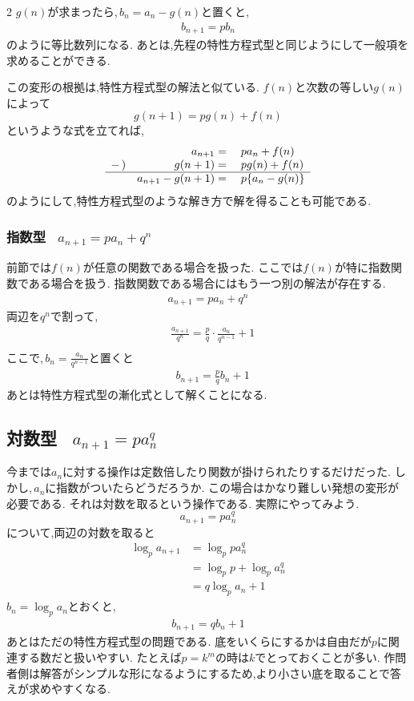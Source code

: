 \documentclass[dvipdfmx,a4paper,11pt,fleqn,openany]{jsbook}
\begin{document}
\begin{multicols*}{2}
      $g(n)$が求まったら,\,$b_n=a_n-g(n)$と置くと,
      \begin{align*}
        b_{n+1}=pb_n
      \end{align*}
      のように等比数列になる.
      あとは,先程の特性方程式型と同じようにして一般項を求めることができる.

      この変形の根拠は,特性方程式型の解法と似ている.
      $f(n)$と次数の等しい$g(n)$によって
      \[
        g(n+1)=pg(n)+f(n)
      \]
      というような式を立てれば,
      \[
        \begin{array}{rrl}
          & a_{n+1}={} & pa_n+f(n)\\
          -\,) & g(n+1)={} & pg(n)+f(n)\\ \hline
          & a_{n+1}-g(n+1)={} & p\{a_n-g(n)\}
        \end{array}
      \]
      のようにして,特性方程式型のような解き方で解を得ることも可能である.
    \subsubsection{指数型  \, $\displaystyle a_{n+1}=pa_n+q^n$}
      前節では$f(n)$が任意の関数である場合を扱った.
      ここでは$f(n)$が特に指数関数である場合を扱う.
      指数関数である場合にはもう一つ別の解法が存在する.
      \begin{align*}
        a_{n+1}=pa_n+q^n
      \end{align*}
      両辺を$q^n$で割って,
      \begin{align*}      
        &\frac{a_{n+1}}{q^n}=\frac{p}{q}\cdot\frac{a_n}{q^{n-1}}+1\\
      \end{align*}
      ここで,\,$b_n=\frac{a_n}{q^{n-1}}$と置くと
      \begin{align*}
        &b_{n+1}=\frac{p}{q}b_n+1
      \end{align*}
      あとは特性方程式型の漸化式として解くことになる.
  \subsection{対数型 \, $a_{n+1}=pa_n^q$}
    今までは$a_n$に対する操作は定数倍したり関数が掛けられたりするだけだった.
    しかし,\,$a_n$に指数がついたらどうだろうか.
    この場合はかなり難しい発想の変形が必要である.
    それは対数を取るという操作である.
    実際にやってみよう.
    \[
      a_{n+1}=pa_n^q
    \]
    について,両辺の対数を取ると
    \begin{align*}
      \log_p{a_{n+1}}&=\log_p{pa_n^q}\\
      &=\log_p{p}+\log_p{a_n^q}\\
      &=q\log_p{a_n}+1
    \end{align*}
    $b_n=\log_p{a_n}$とおくと,
    \begin{align*}
      b_{n+1}=qb_n+1
    \end{align*}
    あとはただの特性方程式型の問題である.
    底をいくらにするかは自由だが$p$に関連する数だと扱いやすい.
    たとえば$p=k^m$の時は$k$でとっておくことが多い.
    作問者側は解答がシンプルな形になるようにするため,より小さい底を取ることで答えが求めやすくなる.


\end{multicols*}
\end{document}
